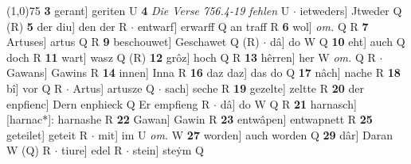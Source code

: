 \documentclass[8pt,a4paper,notitlepage]{article}
\begin{document}
\begin{table}[ht]
\begin{minipage}[t]{0.5\linewidth}
\line(1,0){75} \newline
\textbf{3} gerant] geriten U \textbf{4} \textit{Die Verse 756.4-19 fehlen} U   $\cdot$ ietweders] Jtweder Q (R) \textbf{5} der diu] den der R  $\cdot$ entwarf] erwarff Q an traff R \textbf{6} wol] \textit{om.} Q R \textbf{7} Artuses] artus Q R \textbf{9} beschouwet] Geschawet Q (R)  $\cdot$ dâ] do W Q \textbf{10} eht] auch Q doch R \textbf{11} wart] wasz Q (R) \textbf{12} grôz] hoch Q R \textbf{13} hêrren] her W \textit{om.} Q R  $\cdot$ Gawans] Gawins R \textbf{14} innen] Inna R \textbf{16} daz daz] das do Q \textbf{17} nâch] nache R \textbf{18} bî] vor Q R  $\cdot$ Artus] artusze Q  $\cdot$ sach] seche R \textbf{19} gezelte] zeltte R \textbf{20} der enpfienc] Dern enphieck Q Er empfieng R  $\cdot$ dâ] do W Q R \textbf{21} harnasch] [harnac*]: harnashe R \textbf{22} Gawan] Gawin R \textbf{23} entwâpen] entwapnett R \textbf{25} geteilet] geteit R  $\cdot$ mit] im U \textit{om.} W \textbf{27} worden] auch worden Q \textbf{29} dâr] Daran W (Q) R  $\cdot$ tiure] edel R  $\cdot$ stein] steẏm Q \newline
\end{minipage}
\end{table}
\end{document}
